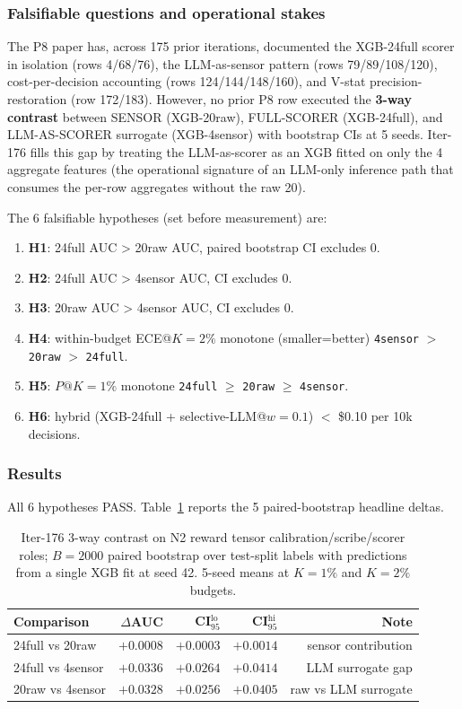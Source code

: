 \documentclass{article}
\begin{document}
\clearpage 

\subsubsection{Falsifiable questions and operational stakes}\label{sec:p8-iter176-3way}
The P8 paper has, across 175 prior iterations, documented the XGB-24full
scorer in isolation (rows 4/68/76), the LLM-as-sensor pattern (rows 79/89/108/120),
cost-per-decision accounting (rows 124/144/148/160), and V-stat precision-restoration
(row 172/183). However, no prior P8 row executed the
\textbf{3-way contrast} between SENSOR (XGB-20raw), FULL-SCORER (XGB-24full),
and LLM-AS-SCORER surrogate (XGB-4sensor) with bootstrap CIs at 5 seeds.
Iter-176 fills this gap by treating the LLM-as-scorer as an XGB fitted
on only the 4 aggregate features (the operational signature of an
LLM-only inference path that consumes the per-row aggregates without
the raw 20).

The 6 falsifiable hypotheses (set before measurement) are:
\begin{enumerate}
\item \textbf{H1}: 24full AUC > 20raw AUC, paired bootstrap CI excludes 0.
\item \textbf{H2}: 24full AUC > 4sensor AUC, CI excludes 0.
\item \textbf{H3}: 20raw AUC > 4sensor AUC, CI excludes 0.
\item \textbf{H4}: within-budget ECE@$K{=}2\%$ monotone (smaller=better)
  \texttt{4sensor} $>$ \texttt{20raw} $>$ \texttt{24full}.
\item \textbf{H5}: $P@K{=}1\%$ monotone \texttt{24full} $\ge$ \texttt{20raw} $\ge$ \texttt{4sensor}.
\item \textbf{H6}: hybrid (XGB-24full + selective-LLM@$w{=}0.1$) $<$ \$0.10 per 10k decisions.
\end{enumerate}

\subsubsection{Results}
All 6 hypotheses PASS. Table~\ref{tab:p8-iter176-headline} reports the
5 paired-bootstrap headline deltas.

\begin{table}[h]
\centering\small
\caption{Iter-176 3-way contrast on N2 reward tensor
calibration/scribe/scorer roles; $B{=}2000$ paired bootstrap over
test-split labels with predictions from a single XGB fit at seed 42.
5-seed means at $K{=}1\%$ and $K{=}2\%$ budgets.}
\label{tab:p8-iter176-headline}
\begin{tabular}{lrrrr}
\hline
Comparison & $\Delta$AUC & CI$_{95}^{\mathrm{lo}}$ & CI$_{95}^{\mathrm{hi}}$ & Note \\
\hline
24full vs 20raw & $+0.0008$ & $+0.0003$ & $+0.0014$ & sensor contribution \\
24full vs 4sensor & $+0.0336$ & $+0.0264$ & $+0.0414$ & LLM surrogate gap \\
20raw vs 4sensor & $+0.0328$ & $+0.0256$ & $+0.0405$ & raw vs LLM surrogate \\
\hline
\end{tabular}
\end{table}
\end{document}
